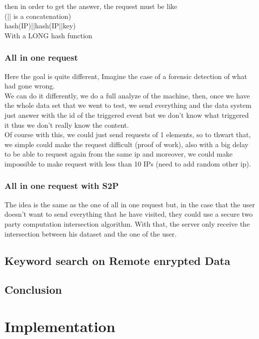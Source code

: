 \documentclass{eplmastersthesis}
\begin{document}
then in order to get the answer, the request must be like\\
(|| is a concatenation)\\
hash(IP)||hash(IP||key)\\
With a LONG hash function

\subsection{All in one request}
Here the goal is quite different, Imagine the case of a forensic detection of what had gone wrong.\\
We can do it differently, we do a full analyze of the machine, then, once we have the whole data set that we went to test, we send everything and the data system just answer with the id of the triggered event but we don't know what triggered it thus we don't really know the content.\\
Of course with this, we could just send requests of 1 elements, so to thwart that, we simple could make the request difficult (proof of work), also with a big delay to be able to request again from the same ip and moreover, we could make impossible to make request with less than 10 IPs (need to add random other ip).

\subsection{All in one request with S2P}
The idea is the same as the one of all in one request but, in the case that the user doesn't want to send everything that he have visited, they could use a secure two party computation intersection algorithm.
With that, the server only receive the intersection between his dataset and the one of the user.

\section{Keyword search on Remote enrypted Data}

\section{Conclusion}

\chapter{Implementation}
\end{document}
